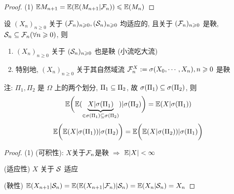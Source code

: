 \begin{proof}
    (1) $\mathbb E M_{n+1}=\mathbb E(\mathbb E(M_{n+1}|\mathcal{F}_n))\leqslant \mathbb E(M_n)$
\end{proof}

\begin{theorem}
    设 $(X_n)_{n\geq 0}$ 关于 $(\mathcal{F}_n)_{n\geqslant 0}, (\mathcal{S}_n)_{n\geqslant 0}$ 均适应的, 且关于 $(\mathcal{F}_n)_{n\geqslant 0}$ 是鞅, $\mathcal{S}_n\subseteq \mathcal{F}_n (\forall n\geqslant 0)$, 则
    \begin{enumerate}
        \item $(X_n)_{n\geq 0}$ 关于 $(\mathcal{S}_n)_{n\geqslant 0}$ 也是鞅 (小流吃大流)
        \item 特别地, $(X_n)_{n\geq 0}$ 关于其自然域流 $\mathcal{F}_n^X:=\sigma(X_0,\cdots,X_n), n\geqslant 0$ 是鞅 
    \end{enumerate}
\end{theorem}

注: $\Pi_1,\Pi_2$ 是 $\Omega$ 上的两个划分, $\Pi_1\subseteq \Pi_2$, 故 $\sigma(\Pi_1)\subseteq \sigma(\Pi_2)$, 则
\[
\mathbb E\bigg(
    \mathbb E(
        \underbrace{X|\sigma(\Pi_1)}_{\in \sigma(\Pi_1)\subseteq \sigma(\Pi_2)}
    )| \sigma(\Pi_2)
\bigg)=\mathbb E(X|\sigma(\Pi_1))
\]
\[
\mathbb E\bigg(
    \mathbb E(
        X|\sigma(\Pi_1)
    )| \sigma(\Pi_2)
\bigg)=
\mathbb E\bigg(
    \mathbb E(
        X|\sigma(\Pi_2)
    )| \sigma(\Pi_1)
\bigg)
\]
\begin{proof}
    (1) (可积性): $X$关于$\mathcal{F}_n$是鞅 $\Rightarrow$ $\mathbb E|X|<\infty$

    (适应性) $X$ 关于 $\mathcal{S}$ 适应

    (鞅性) $\mathbb E(X_{n+1}|\mathcal{S}_n)=\mathbb E(\mathbb E(X_{n+1}|\mathcal{F}_n)|\mathcal{S}_n)=\mathbb E(X_n|\mathcal{S}_n)=X_n$
\end{proof}